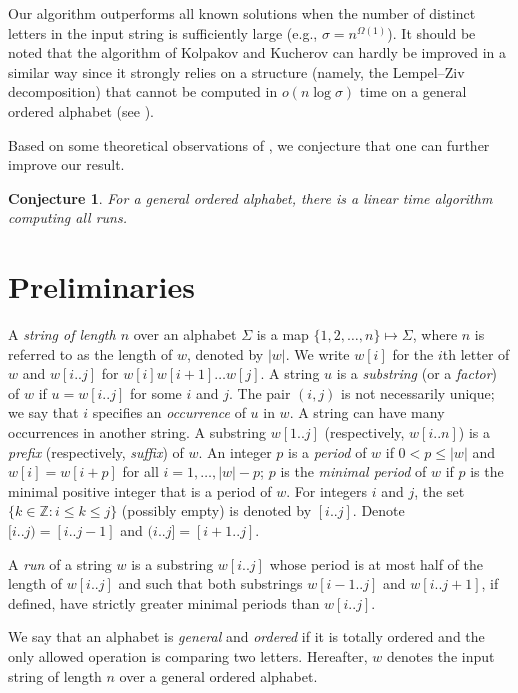 \documentclass[3p,twocolumn]{elsarticle}
\theoremstyle{plain}
\newtheorem*{conjecture}{Conjecture}
\theoremstyle{definition}
\begin{document}
Our algorithm outperforms all known solutions when the number of distinct letters in the input string is sufficiently large (e.g., $\sigma = n^{\Omega(1)}$). It should be noted that the algorithm of Kolpakov and Kucherov can hardly be improved in a similar way since it strongly relies on a structure (namely, the Lempel--Ziv decomposition) that cannot be computed in $o(n\log\sigma)$ time on a general ordered alphabet (see \cite{Kosolobov}).

Based on some theoretical observations of \cite{Kosolobov}, we conjecture that one can further improve our result.
\begin{conjecture}
For a general ordered alphabet, there is a linear time algorithm computing all runs.
\end{conjecture}


\section{Preliminaries}

A \emph{string of length $n$} over an alphabet $\Sigma$ is a map $\{1,2,\ldots,n\} \mapsto \Sigma$, where $n$ is referred to as the length of $w$, denoted by $|w|$. We write $w[i]$ for the $i$th letter of $w$ and $w[i..j]$ for $w[i]w[i{+}1]\ldots w[j]$. A string $u$ is a \emph{substring} (or a \emph{factor}) of $w$ if $u=w[i..j]$ for some $i$ and $j$. The pair $(i,j)$ is not necessarily unique; we say that $i$ specifies an \emph{occurrence} of $u$ in $w$. A string can have many occurrences in another string. A substring $w[1..j]$ (respectively, $w[i..n]$) is a \emph{prefix} (respectively, \emph{suffix}) of $w$. An integer $p$ is a \emph{period} of $w$ if $0 < p \le |w|$ and $w[i] = w[i{+}p]$ for all $i=1,\ldots,|w|{-}p$; $p$ is the \emph{minimal period} of $w$ if $p$ is the minimal positive integer that is a period of $w$. For integers $i$ and $j$, the set $\{k\in \mathbb{Z} \colon i \le k \le j\}$ (possibly empty) is denoted by $[i..j]$. Denote $[i..j) = [i..j{-}1]$ and $(i..j] = [i{+}1..j]$.

A \emph{run} of a string $w$ is a substring $w[i..j]$ whose period is at most half of the length of $w[i..j]$ and such that both substrings $w[i{-}1..j]$ and $w[i..j{+}1]$, if defined, have strictly greater minimal periods than $w[i..j]$.

We say that an alphabet is \emph{general} and \emph{ordered} if it is totally ordered and the only allowed operation is comparing two letters. Hereafter, $w$ denotes the input string of length $n$ over a general ordered alphabet.
\end{document}
